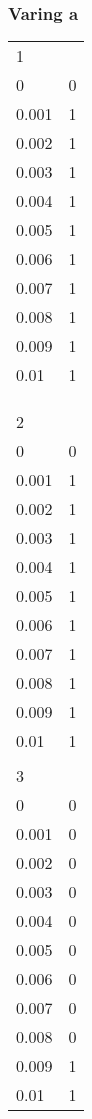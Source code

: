 \documentclass{article}
\begin{document}
\subsubsection{Varing a}
\begin{table}[]
\begin{tabular}{ll}
1     &   \\
0     & 0 \\
0.001 & 1 \\
0.002 & 1 \\
0.003 & 1 \\
0.004 & 1 \\
0.005 & 1 \\
0.006 & 1 \\
0.007 & 1 \\
0.008 & 1 \\
0.009 & 1 \\
0.01  & 1 \\
      &   \\
      &   \\
      &   \\
2     &   \\
0     & 0 \\
0.001 & 1 \\
0.002 & 1 \\
0.003 & 1 \\
0.004 & 1 \\
0.005 & 1 \\
0.006 & 1 \\
0.007 & 1 \\
0.008 & 1 \\
0.009 & 1 \\
0.01  & 1 \\
      &   \\
3     &   \\
0     & 0 \\
0.001 & 0 \\
0.002 & 0 \\
0.003 & 0 \\
0.004 & 0 \\
0.005 & 0 \\
0.006 & 0 \\
0.007 & 0 \\
0.008 & 0 \\
0.009 & 1 \\
0.01  & 1
\end{tabular}
\end{table}
\end{document}
